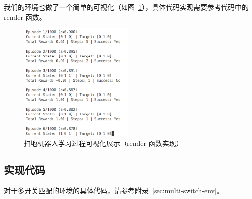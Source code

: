 我们的环境也做了一个简单的可视化（如图~\ref{fig:multiswitch-env-render}），具体代码实现需要参考代码中的 \textsf{render} 函数。

\begin{figure}[htbp]
    \centering
    \includegraphics[width=0.5\textwidth]{figure/multi-switch-env_render1.jpg}
    \caption{扫地机器人学习过程可视化展示（\textsf{render} 函数实现）}\label{fig:multiswitch-env-render}
\end{figure}

\subsection{实现代码}

对于多开关匹配的环境的具体代码，请参考附录~\ref{sec:multi-switch-env}。